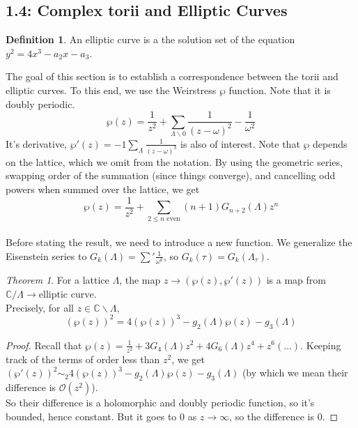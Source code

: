 \documentclass[11pt]{article}
\theoremstyle{definition}
\newtheorem{definition}{Definition}[section]
\theoremstyle{example}
\theoremstyle{remark}
\theoremstyle{lemma}
\theoremstyle{proposition}
\theoremstyle{Problem}
\theoremstyle{Solution}
\theoremstyle{theorem}
\newtheorem{theorem}{Theorem}[section]
\theoremstyle{corollary}
\begin{document}
\subsection{1.4: Complex torii and Elliptic Curves}
\begin{definition}
An elliptic curve is a the solution set of the equation $y^2 = 4x^3-a_2x-a_3$.
\end{definition}
The goal of this section is to establish a correspondence between the torii and elliptic curves. To this end, we use the Weirstress $\wp$ function. Note that it is doubly periodic.
$$\wp(z) = \frac{1}{z^2} +\sum_{\Lambda\backslash 0} \frac{1}{(z-\omega)^2}-\frac{1}{\omega^2}$$
It's derivative, $\wp'(z) = -1\sum_\Lambda \frac{1}{(z-\omega)^3}$ is also of interest. Note that $\wp$ depends on the lattice, which we omit from the notation. By using the geometric series, swapping order of the summation (since things converge), and cancelling odd powers when summed over the lattice, we get 
$$\wp(z) = \frac{1}{z^2} + \sum_{2\leq n \text{ even}} (n+1)G_{n+2}(\Lambda)z^n$$\\ 
Before stating the result, we need to introduce a new function. We generalize the Eisenstein series to $G_k(\Lambda) = \sum' \frac{1}{\omega^k}$, so $G_k(\tau) = G_k(\Lambda_\tau)$.\\
\begin{theorem} 
For a lattice $\Lambda$, the map $z\to(\wp(z), \wp'(z))$ is a map from $\mathbb{C}/\Lambda \to \text{elliptic curve}$. \\
Precisely, for all $z\in \mathbb{C}\backslash \Lambda$,
$$(\wp(z))^2 = 4(\wp(z))^3 - g_2(\Lambda)\wp(z) - g_3(\Lambda)$$
\end{theorem}
\begin{proof}
Recall that $\wp(z) = \frac{1}{z^2} + 3G_4(\Lambda)z^2 + 4G_6(\Lambda)z^4 + z^6(...)$. Keeping track of the terms of order less than $z^2$, we get $(\wp'(z))^2 \sim_2 4(\wp(z))^3-g_2(\Lambda)\wp(z) - g_3(\Lambda)$ (by which we mean their difference is $\mathcal{O}(z^2)$).\\
So their difference is a holomorphic and doubly periodic function, so it's bounded, hence constant. But it goes to $0$ as $z\to\infty$, so the difference is $0$.
\end{proof}
\end{document}
